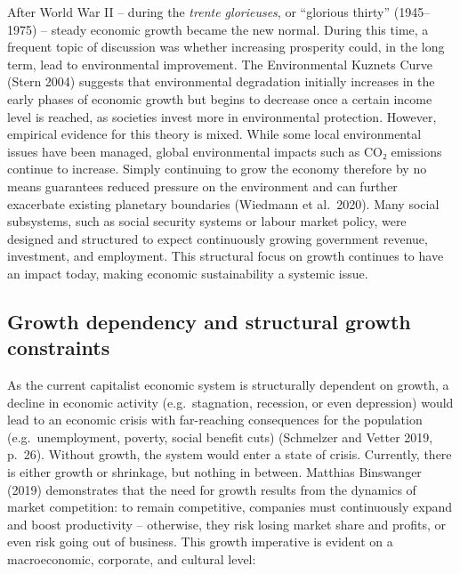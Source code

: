 \documentclass[
  a4paper,
  openany]{book}
\begin{document}
After World War II -- during the \emph{trente glorieuses}, or ``glorious
thirty'' (1945--1975) -- steady economic growth became the new normal.
During this time, a frequent topic of discussion was whether increasing
prosperity could, in the long term, lead to environmental improvement.
The Environmental Kuznets Curve (Stern 2004) suggests that environmental
degradation initially increases in the early phases of economic growth
but begins to decrease once a certain income level is reached, as
societies invest more in environmental protection. However, empirical
evidence for this theory is mixed. While some local environmental issues
have been managed, global environmental impacts such as CO₂ emissions
continue to increase. Simply continuing to grow the economy therefore by
no means guarantees reduced pressure on the environment and can further
exacerbate existing planetary boundaries (Wiedmann et al.~2020). Many
social subsystems, such as social security systems or labour market
policy, were designed and structured to expect continuously growing
government revenue, investment, and employment. This structural focus on
growth continues to have an impact today, making economic sustainability
a systemic issue.

\subsection{Growth dependency and structural growth
constraints}\label{growth-dependency-and-structural-growth-constraints}

As the current capitalist economic system is structurally dependent on
growth, a decline in economic activity (e.g.~stagnation, recession, or
even depression) would lead to an economic crisis with far-reaching
consequences for the population (e.g.~unemployment, poverty, social
benefit cuts) (Schmelzer and Vetter 2019, p.~26). Without growth, the
system would enter a state of crisis. Currently, there is either growth
or shrinkage, but nothing in between. Matthias Binswanger (2019)
demonstrates that the need for growth results from the dynamics of
market competition: to remain competitive, companies must continuously
expand and boost productivity -- otherwise, they risk losing market
share and profits, or even risk going out of business. This growth
imperative is evident on a macroeconomic, corporate, and cultural level:
\end{document}
